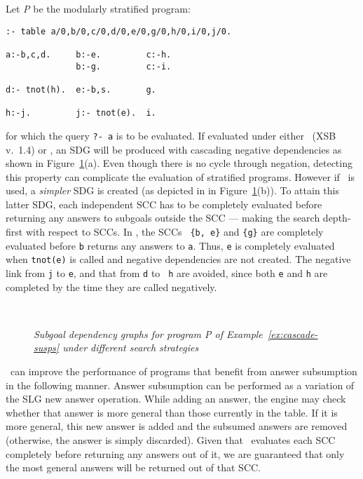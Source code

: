 \begin{example} \label{ex:cascade-susps} \rm
Let \emph{P} be the modularly stratified program:
\begin{verbatim}
:- table a/0,b/0,c/0,d/0,e/0,g/0,h/0,i/0,j/0.

a:-b,c,d.     b:-e.         c:-h. 
              b:-g.         c:-i.
 
d:- tnot(h).  e:-b,s.       g.            

h:-j.         j:- tnot(e).  i.                             
\end{verbatim}
\noindent
for which the query {\tt ?- a} is to be evaluated.  If evaluated under
either \oldsched\ (XSB v.~1.4) or \newsched, an SDG will be produced
with cascading negative dependencies as shown in
Figure~\ref{fig:lrd-pgm}(a).  Even though there is no cycle through
negation, detecting this property can complicate the evaluation of
stratified programs. However if \localsched\ is used, a \emph{simpler}
SDG is created (as depicted in in Figure~\ref{fig:lrd-pgm}(b)). To attain
this latter SDG, each independent SCC has to be completely evaluated
before returning any answers to subgoals outside the SCC --- making the
search depth-first with respect to SCCs.  In \localsched, the SCCs {\tt
\{b, e\}} and {\tt \{g\}} are completely evaluated before {\tt b}
returns any answers to {\tt a}. Thus, {\tt e} is completely evaluated
when {\tt tnot(e)} is called and negative dependencies are not created.
The negative link from {\tt j} to {\tt e}, and that from {\tt d} to {\tt
h} are avoided, since both {\tt e} and {\tt h} are completed by the time
they are called negatively.

\begin{figure}[htb]
\centering
\mbox{\quad
      \quad
     }
\caption{\emph{Subgoal dependency graphs for program \emph{P} of
Example~\ref{ex:cascade-susps} under different search strategies}}
\label{fig:lrd-pgm}
\end{figure}

\end{example}

\Localsched\ can improve the performance of programs that benefit
from answer subsumption in the following manner.  Answer subsumption can
be performed as a variation of the SLG {\sc new answer} operation. While
adding an answer, the engine may check whether that answer is more
general than those currently in the table.  If it is more general, this
new answer is added and the subsumed answers are removed (otherwise, the
answer is simply discarded).  Given that \localsched\ evaluates each SCC
completely before returning any answers out of it, we are guaranteed
that only the most general answers will be returned out of that SCC.


